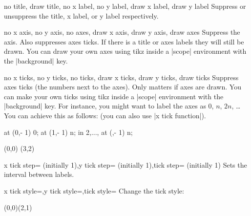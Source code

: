 \documentclass{ltxdoc}
\begin{document}
\begin{sseqdata}[name=ex1,degree={#1}{1-#1}]
\begin{keylist}{no title, draw title, no x label, no y label, draw x label, draw y label}
Suppress or unsuppress the title, x label, or y label respectively.
\end{keylist}

\begin{keylist}{no x axis, no y axis, no axes, draw x axis, draw y axis, draw axes}
Suppress the axis. Also suppresses axes ticks. If there is a title or axes labels they will still be drawn. You can draw your own axes using tikz inside a |scope| environment with the |background| key.
\end{keylist}

\begin{keylist}{no x ticks, no y ticks, no ticks, draw x ticks, draw y ticks, draw ticks}
Suppress axes ticks (the numbers next to the axes). Only matters if axes are drawn. You can make your own ticks using tikz inside a |scope| environment with the |background| key. For instance, you might want to label the axes as 0, $n$, $2n$, \ldots You can achieve this as follows: (you can also use |x tick function|).
\begin{codeexample}[width=5.7cm]
\begin{sseqpage}[no x ticks, x range={0}{3}]
\begin{scope}[background]
    \node at (0,\ymin - 1) {0};
    \node at (1,\ymin - 1) {\protect\vphantom{2}n};
\foreach \n in {2,..., \xmax}{
    \node at (\n,\ymin - 1) {\n n};
}
\end{scope}
\class(0,0)
\class(3,2)
\end{sseqpage}
\end{codeexample}
\end{keylist}

\begin{keylist}{x tick step= (initially 1),y tick step= (initially 1),tick step= (initially 1)}
Sets the interval between labels.
\end{keylist}

\begin{keylist}{x tick style=,y tick style=,tick style=}
Change the tick style:
\begin{codeexample}[width=7cm]
\begin{sseqpage}[tick style={blue,font=\tiny}]
\class(0,0)\class(2,1)
\end{sseqpage}
\end{codeexample}
\end{keylist}


\end{sseqdata}
\end{document}
